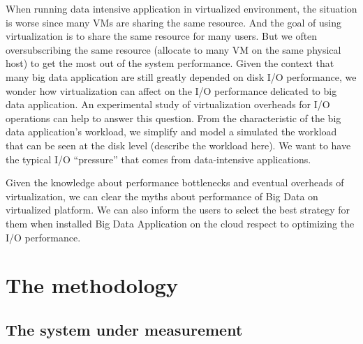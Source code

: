 \documentclass{acmsig}
\begin{document}
When running data intensive application in virtualized environment, the situation is worse since many VMs are sharing the same resource.
And the goal of using virtualization is to share the same resource for many users.  But we often oversubscribing the same resource (allocate to many VM on the same physical host) to get the most out of the system performance.
Given the context that many big data application are still greatly depended on disk I/O performance, we wonder how virtualization can affect on the I/O performance delicated to big data application. An experimental study of virtualization overheads for I/O operations can help to answer this question. From the characteristic of the big data application's workload, we simplify and model a simulated the workload that can be seen at the disk level (describe the workload here). We want to have the typical I/O ``pressure'' that comes from data-intensive applications.

Given the knowledge about performance bottlenecks and eventual overheads of virtualization, we can clear the myths about performance of Big Data on virtualized platform. We can also inform the users to select the best strategy for them when installed Big Data Application on the cloud respect to optimizing the I/O performance.



\section{The methodology}

\subsection{The system under measurement}
\end{document}
